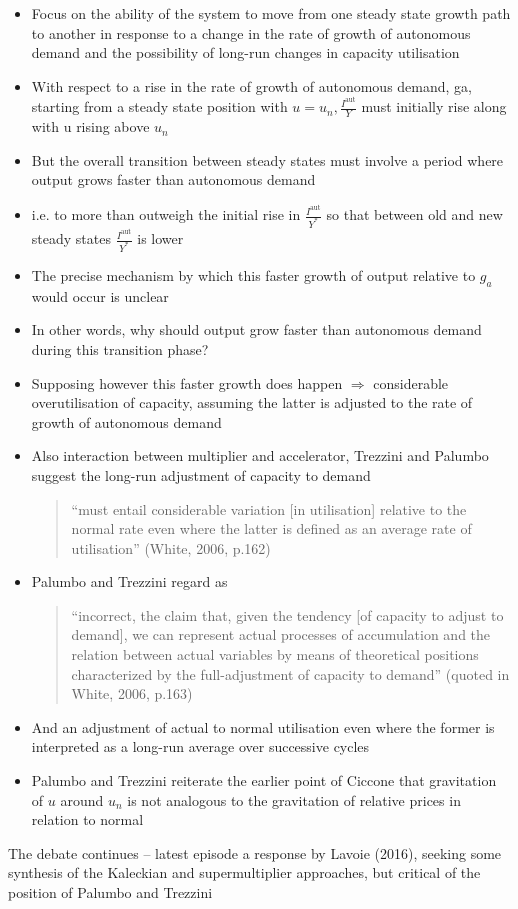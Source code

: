 \documentclass[a4paper,twoside]{article}
\numberwithin{equation}{section}
\numberwithin{figure}{section}
\begin{document}
\begin{enumerate}
\begin{itemize}
			\item Focus on the ability of the system to move from one steady state growth path to another in response to a change in the rate of growth of autonomous demand and the possibility of long-run changes in capacity utilisation
			\item With respect to a rise in the rate of growth of autonomous demand, ga, starting from a steady state position with \( u = u_n, \frac{I^\text{aut}}{Y} \) must initially rise along with u rising above \( u_n \)
			\item But the overall transition between steady states must involve a period where output grows faster than autonomous demand
			\item i.e. to more than outweigh the initial rise in \( \frac{I^\text{aut}}{Y^*} \) so that between old and new steady states \( \frac{I^\text{aut}}{Y^*} \) is lower
			\item The precise mechanism by which this faster growth of output relative to \( g_a \) would occur is unclear
			\item In other words, why should output grow faster than autonomous demand during this transition phase?
			\item Supposing however this faster growth does happen \( \Rightarrow \) considerable overutilisation of capacity, assuming the latter is adjusted to the rate of growth of autonomous demand
			\item Also interaction between multiplier and accelerator, Trezzini and Palumbo suggest the long-run adjustment of capacity to demand
			\begin{quote}
				``must entail considerable variation [in utilisation] relative to the normal rate even where the latter is defined as an average rate of utilisation'' (White, 2006, p.162)
			\end{quote}
			\item Palumbo and Trezzini regard as
			\begin{quote}
				``incorrect, the claim that, given the tendency [of capacity to adjust to demand], we can represent actual processes of accumulation and the relation between actual variables by means of theoretical positions characterized by the full-adjustment of capacity to demand'' (quoted in White, 2006, p.163)
			\end{quote}
			\item And an adjustment of actual to normal utilisation even where the former is interpreted as a long-run average over successive cycles
			\item \textcolor{myred}{Palumbo and Trezzini reiterate the earlier point of Ciccone that gravitation of \( u \) around \( u_n \) is not analogous to the gravitation of relative prices in relation to normal}
		\end{itemize}
	\end{enumerate}
	The debate continues -- latest episode a response by Lavoie (2016), seeking some synthesis of the Kaleckian and supermultiplier approaches, but critical of the position of Palumbo and Trezzini
\end{document}
